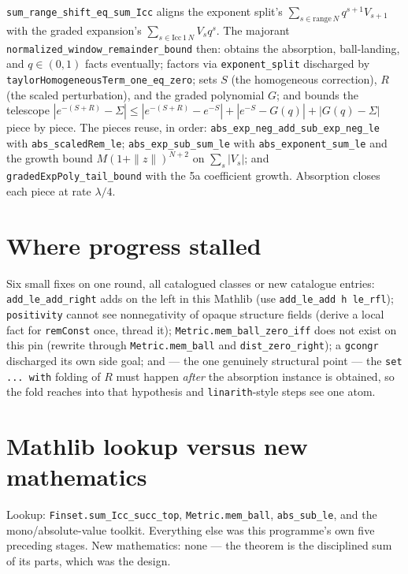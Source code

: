 \documentclass[11pt]{article}
\newcommand{\code}[1]{\texttt{#1}}
\begin{document}
\begin{sloppypar}
\code{sum\_range\_shift\_eq\_sum\_Icc} aligns the exponent split's
$\sum_{s \in \mathrm{range}\,N} q^{s+1} V_{s+1}$ with the graded
expansion's $\sum_{s \in \mathrm{Icc}\,1\,N} V_s q^s$. The majorant
\code{normalized\_window\_remainder\_bound} then: obtains the
absorption, ball-landing, and $q \in (0,1)$ facts eventually;
factors via \code{exponent\_split} discharged by
\code{taylorHomogeneousTerm\_one\_eq\_zero}; sets $S$ (the
homogeneous correction), $R$ (the scaled perturbation), and the
graded polynomial $G$; and bounds the telescope
$|e^{-(S+R)} - \Sigma| \le |e^{-(S+R)} - e^{-S}| +
|e^{-S} - G(q)| + |G(q) - \Sigma|$ piece by piece. The pieces reuse,
in order: \code{abs\_exp\_neg\_add\_sub\_exp\_neg\_le} with
\code{abs\_scaledRem\_le}; \code{abs\_exp\_sub\_sum\_le} with
\code{abs\_exponent\_sum\_le} and the growth bound $M(1+\|z\|)^{N+2}$
on $\sum_s|V_s|$; and \code{gradedExpPoly\_tail\_bound} with the 5a
coefficient growth. Absorption closes each piece at rate $\lambda/4$.
\end{sloppypar}

\section{Where progress stalled}

\begin{sloppypar}
Six small fixes on one round, all catalogued classes or new
catalogue entries: \code{add\_le\_add\_right} adds on the left in
this Mathlib (use \code{add\_le\_add h le\_rfl});
\code{positivity} cannot see nonnegativity of opaque structure
fields (derive a local fact for \code{remConst} once, thread it);
\code{Metric.mem\_ball\_zero\_iff} does not exist on this pin
(rewrite through \code{Metric.mem\_ball} and
\code{dist\_zero\_right}); a \code{gcongr} discharged its own side
goal; and --- the one genuinely structural point --- the
\code{set ... with} folding of $R$ must happen \emph{after} the
absorption instance is obtained, so the fold reaches into that
hypothesis and \code{linarith}-style steps see one atom.
\end{sloppypar}

\section{Mathlib lookup versus new mathematics}

Lookup: \code{Finset.sum\_Icc\_succ\_top}, \code{Metric.mem\_ball},
\code{abs\_sub\_le}, and the mono/absolute-value toolkit. Everything
else was this programme's own five preceding stages. New mathematics:
none --- the theorem is the disciplined sum of its parts, which was
the design.
\end{document}
